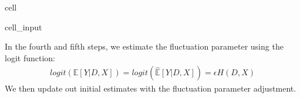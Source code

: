 \documentclass[letterpaper,10pt,english]{jupyterBook}
\begin{document}
\begin{sphinxuseclass}{cell}\begin{sphinxVerbatimInput}

\begin{sphinxuseclass}{cell_input}
\begin{sphinxVerbatim}[commandchars=\\\{\}]
  
  
  \PYG{p}{[} \PYG{p}{]}
      

\PYG{p}{[}\PYG{p}{]}  
\PYG{p}{[}\PYG{p}{]}  
\PYG{p}{[}\PYG{p}{]}  \PYG{p}{[}\PYG{p}{]}  \PYG{p}{[}\PYG{p}{]}  \PYG{p}{[}\PYG{p}{]}  \PYG{p}{[}\PYG{p}{]}
\end{sphinxVerbatim}

\end{sphinxuseclass}\end{sphinxVerbatimInput}

\end{sphinxuseclass}
\sphinxAtStartPar
In the fourth and fifth steps, we estimate the fluctuation parameter using the logit function:
\begin{equation*}
\begin{split}logit(\mathbb{E}[Y|D,X]) = logit(\hat{\mathbb{E}}[Y|D,X]) = \epsilon H(D,X)\end{split}
\end{equation*}
\sphinxAtStartPar
We then update out initial estimates with the fluctuation parameter adjustment.
\end{document}
